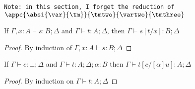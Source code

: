 
\texttt{Note: in this section, I forget the reduction of $\appc{\absi{\var}{\tm}}{\tmtwo}{\vartwo}{\tmthree}$}

\begin{lemma}\label{lemma:subst_var}
  If $\Gamma, x:A\vdash s:B; \Delta$ and $\Gamma\vdash t:A; \Delta$, then $\Gamma\vdash s[t/x]: B; \Delta$
\end{lemma}
\begin{proof}
  By induction of $\Gamma, x:A\vdash s:B; \Delta$
\end{proof}

\begin{lemma}\label{lemma:subst_named}
  If $\Gamma\vdash c:\bot; \Delta$ and $\Gamma\vdash t:A; \Delta; \alpha:B$ then $\Gamma\vdash t[c/[\alpha] u]:A; \Delta$
\end{lemma}
\begin{proof}
  By induction on $\Gamma\vdash t:A; \Delta$
\end{proof}

